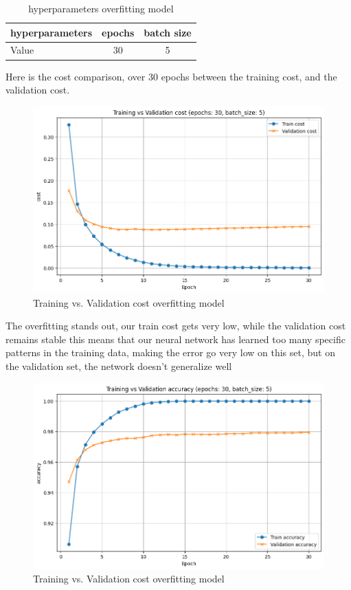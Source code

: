 \documentclass[a4paper, twocolumn, twoside]{article}
\begin{document}
	\begin{table}[H]
	\centering
	\begin{tabular}{|l|c|c|}
	\hline
	hyperparameters & epochs & batch size  \\
	\hline
	Value & 30 & 5   \\
	\hline
	\end{tabular}
	\caption{hyperparameters overfitting model}
	\end{table}
        Here is the cost comparison, over 30 epochs between the training cost, and the validation cost.
	\begin{figure}[H]
		\begin{center}
			\includegraphics[width=\columnwidth]{images/cost_overfit.png}
		\end{center}
		\caption{Training vs. Validation cost overfitting model}\label{fig:cost_overfit}
	\end{figure}

	The overfitting stands out, our train cost gets very low, while the validation cost remains stable
	this means that our neural network has learned too many specific patterns in the training data,
	making the error go very low on this set, but on the validation set, the network
	doesn't generalize well

	\begin{figure}[H]
		\begin{center}
			\includegraphics[width=\columnwidth]{images/accuracy_overfit.png}
		\end{center}
		\caption{Training vs. Validation cost overfitting model}\label{fig:accuracy_overfit}
	\end{figure}
\end{document}
